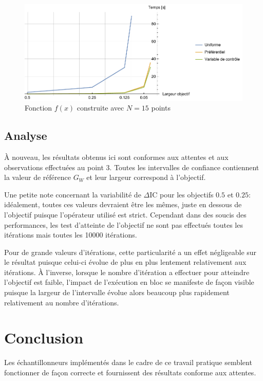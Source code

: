 \documentclass[a4paper,11pt]{article}
\begin{document}
\begin{figure}[h]
	\begin{center}
		\includegraphics[width=15cm]{img_graph2}
	\end{center}
	\caption{Fonction $f(x)$ construite avec $N=15$ points}
\end{figure}

\subsection{Analyse}

À nouveau, les résultats obtenus ici sont conformes aux attentes et aux observations effectuées au point 3. Toutes les intervalles de confiance contiennent la valeur de référence $G_W$ et leur largeur correspond à l'objectif.

Une petite note concernant la variabilité de $\Delta\text{IC}$ pour les objectifs $0.5$ et $0.25$: idéalement, toutes ces valeurs devraient être les mêmes, juste en dessous de l'objectif puisque l'opérateur utilisé est strict. Cependant dans des soucis des performances, les test d'atteinte de l'objectif ne sont pas effectués toutes les itérations mais toutes les 10000 itérations.

Pour de grande valeurs d'itérations, cette particularité a un effet négligeable sur le résultat puisque celui-ci évolue de plus en plus lentement relativement aux itérations. À l'inverse, lorsque le nombre d'itération a effectuer pour atteindre l'objectif est faible, l'impact de l'exécution en bloc se manifeste de façon visible puisque la largeur de l'intervalle évolue alors beaucoup plus rapidement relativement au nombre d'itérations.

\section{Conclusion}

Les échantillonneurs implémentés dans le cadre de ce travail pratique semblent fonctionner de façon correcte et fournissent des résultats conforme aux attentes. 
\end{document}
